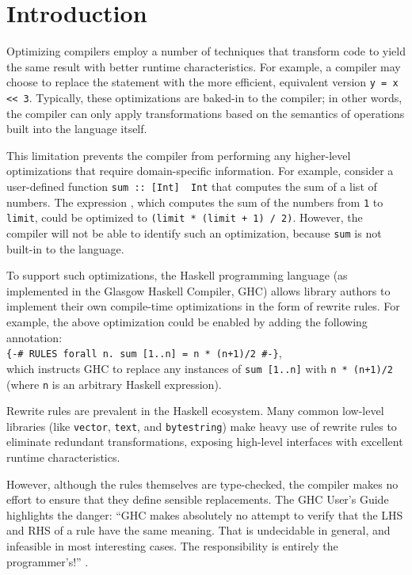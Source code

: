 \section{Introduction}

Optimizing compilers employ a number of techniques that transform code to yield
the same result with better runtime characteristics. For example, a compiler may
choose to replace the statement  with the more efficient,
equivalent version \mbox{\texttt{y = x << 3}}. Typically, these optimizations are
baked-in to the compiler; in other words, the compiler can only apply
transformations based on the semantics of operations built into the language
itself.

This limitation prevents the compiler from performing any higher-level
optimizations that require domain-specific information. For example, consider a
user-defined function \texttt{sum :: [Int] \textrightarrow~Int} that computes the sum of a
list of numbers. The expression \linebreak%
, which computes the sum
of the numbers from \texttt{1} to \texttt{limit}, could be optimized to
\texttt{(limit * (limit + 1) / 2)}. However, the compiler will not be able to
identify such an optimization, because \texttt{sum} is not built-in to the
language.

To support such optimizations, the Haskell programming language (as implemented
in the Glasgow Haskell Compiler, GHC) allows library authors to implement their
own compile-time optimizations in the form of rewrite rules. For example, the
above optimization could be enabled by adding the following annotation:\\
\texttt{\{-\# RULES forall n. sum [1..n] = n * (n+1)/2 \#-\}},\\
which instructs GHC to replace any instances of \texttt{sum [1..n]} with
\texttt{n * (n+1)/2} (where \texttt{n} is an arbitrary Haskell expression).

Rewrite rules are prevalent in the Haskell ecosystem. Many common low-level
libraries (like \texttt{vector}, \texttt{text}, and \texttt{bytestring}) make
heavy use of rewrite rules to eliminate redundant transformations, exposing
high-level interfaces with excellent runtime characteristics.
\cite{coutts2007stream, chakravarty2002approach, chakravarty2007data,
shortcutwiki}

However, although the rules themselves are type-checked, the compiler makes no
effort to ensure that they define sensible replacements. The GHC User's Guide
highlights the danger: ``GHC makes absolutely no attempt to verify that the LHS
and RHS of a rule have the same meaning. That is undecidable in general, and
infeasible in most interesting cases. The responsibility is entirely the
programmer's!'' \cite{userguide}.

